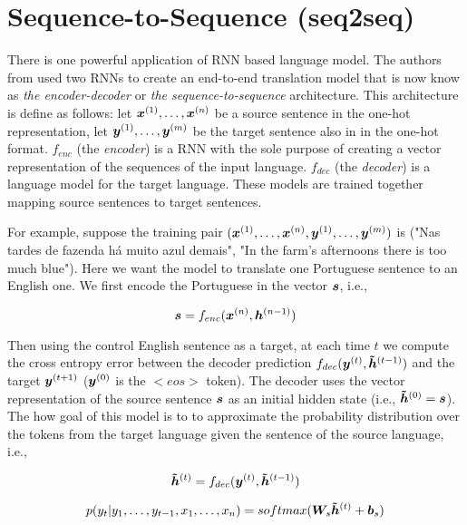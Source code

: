 \section{Sequence-to-Sequence (seq2seq)}
\label{sec:Seq2seq}

There is one powerful application of RNN based language model. The authors from \cite{Sustskever} used two RNNs to create an end-to-end translation model that is now know as \textit{the encoder-decoder} or \textit{the sequence-to-sequence} architecture. This architecture is define as follows: let $\bm{x}^{(1)}, \dots, \bm{x}^{(n)}$ be a source sentence in the one-hot representation,  let $\bm{y}^{(1)}, \dots, \bm{y}^{(m)}$ be the target sentence also in in the one-hot format. $f_{enc}$ (the \textit{encoder}) is a RNN with the sole purpose of creating a vector representation of the sequences of the input language. $f_{dec}$ (the \textit{decoder}) is a language model for the target language. These models are trained together mapping source sentences to target sentences.

For example, suppose the training pair $(\bm{x}^{(1)}, \dots, \bm{x}^{(n)}, \bm{y}^{(1)}, \dots, \bm{y}^{(m)})$ is ("Nas tardes de fazenda há muito azul demais", "In the farm’s afternoons there is too much blue"). Here we want the model to translate one Portuguese sentence to an English one. We first encode the Portuguese in the vector $\bm{s}$, i.e.,

\begin{equation}
\bm{s} = f_{enc}(\bm{x}^{(n)}, \bm{h}^{(n-1)})
\end{equation}

Then using the control English sentence as a target, at each time $t$ we compute the cross entropy error between the decoder prediction $f_{dec}(\bm{y}^{(t)}, \bm{\tilde{h}}^{(t-1)})$ and the target $\bm{y}^{(t+1)}$ ($\bm{y}^{(0)}$ is the $<eos>$ token). The decoder uses the vector representation of the source sentence $\bm{s}$ as an initial hidden state (i.e., $\bm{\tilde{h}}^{(0)} = \bm{s}$). The how goal of this model is to to approximate the probability distribution over the tokens from the target language given the sentence of the source language, i.e.,

\begin{equation}
\bm{\tilde{h}}^{(t)} = f_{dec}(\bm{y}^{(t)}, \bm{\tilde{h}}^{(t-1)})
\end{equation}

\begin{equation}
\label{decpred}
p(y_t | y_1, \dots, y_{t-1}, x_1, \dots, x_{n}) = softmax(\bm{W}_{s}  \bm{\tilde{h}}^{(t)} + \bm{b}_s)
\end{equation}

